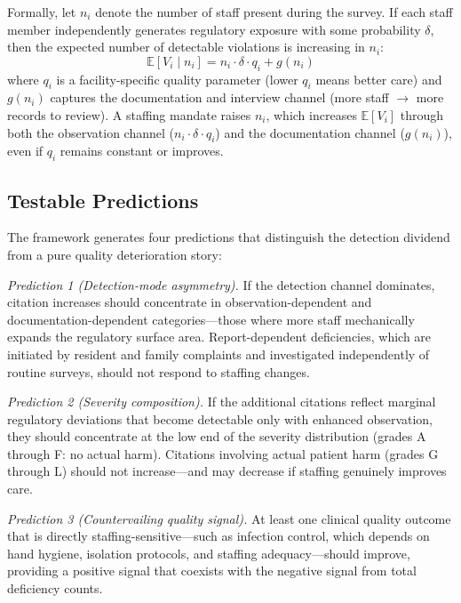 \documentclass[12pt]{article}
\newcommand{\E}{\mathbb{E}}
\begin{document}
Formally, let $n_i$ denote the number of staff present during the survey. If each staff member independently generates regulatory exposure with some probability $\delta$, then the expected number of detectable violations is increasing in $n_i$:
\begin{equation}
\E[V_i \mid n_i] = n_i \cdot \delta \cdot q_i + g(n_i)
\label{eq:staffeffect}
\end{equation}
where $q_i$ is a facility-specific quality parameter (lower $q_i$ means better care) and $g(n_i)$ captures the documentation and interview channel (more staff $\rightarrow$ more records to review). A staffing mandate raises $n_i$, which increases $\E[V_i]$ through both the observation channel ($n_i \cdot \delta \cdot q_i$) and the documentation channel ($g(n_i)$), even if $q_i$ remains constant or improves.

\subsection{Testable Predictions}

The framework generates four predictions that distinguish the detection dividend from a pure quality deterioration story:

\textit{Prediction 1 (Detection-mode asymmetry).} If the detection channel dominates, citation increases should concentrate in observation-dependent and documentation-dependent categories---those where more staff mechanically expands the regulatory surface area. Report-dependent deficiencies, which are initiated by resident and family complaints and investigated independently of routine surveys, should not respond to staffing changes.

\textit{Prediction 2 (Severity composition).} If the additional citations reflect marginal regulatory deviations that become detectable only with enhanced observation, they should concentrate at the low end of the severity distribution (grades A through F: no actual harm). Citations involving actual patient harm (grades G through L) should not increase---and may decrease if staffing genuinely improves care.

\textit{Prediction 3 (Countervailing quality signal).} At least one clinical quality outcome that is directly staffing-sensitive---such as infection control, which depends on hand hygiene, isolation protocols, and staffing adequacy---should improve, providing a positive signal that coexists with the negative signal from total deficiency counts.
\end{document}
